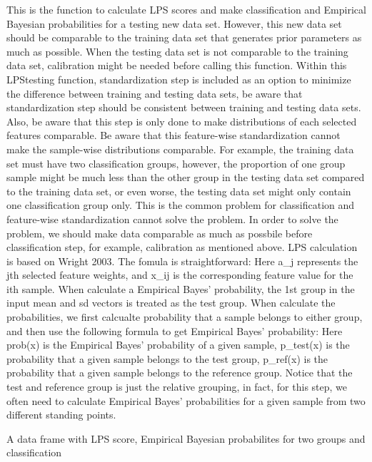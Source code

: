 \documentclass[letterpaper]{book}
\begin{document}
%
\begin{Details}\relax
This is the function to calculate LPS scores and make classification and 
Empirical Bayesian probabilities for a testing new data set. However, this new data set should be 
comparable to the training data set that generates prior parameters as much as possible. When the testing data set is not comparable
to the training data set, calibration might be needed before calling this function. 
Within this LPStesting function, standardization step is included as an option to minimize the difference 
between training and testing data sets, be aware that standardization step should be consistent between training and testing data sets. 
Also, be aware that this step is only done to make distributions of each selected
features comparable. Be aware that this feature-wise standardization cannot make the sample-wise distributions
comparable. For example, the training data set must have two classification groups, however, 
the proportion of one group sample might be much less than the other group in the testing data set 
compared to the training data set, or even worse, the testing data set might only contain one classification 
group only. This is the common problem for classification and feature-wise standardization cannot solve the problem. 
In order to solve the problem, we should make data comparable as much as possbile before classification step, for example, calibration as mentioned above. 
LPS calculation is based on Wright 2003. The fomula is straightforward:
Here a\_j represents the jth selected feature weights, and x\_ij is the corresponding feature value for the ith sample.
When calculate a Empirical Bayes' probability, the 1st group in the input mean and sd vectors is treated as the 
test group. When calculate the probabilities, we first calcualte probability that a sample belongs to either group,
and then use the following formula to get Empirical Bayes' probability:
Here prob(x) is the Empirical Bayes' probability of a given sample, p\_test(x) is the probability that a given sample
belongs to the test group, p\_ref(x) is the probability that a given sample belongs to the reference group.
Notice that the test and reference group is just the relative grouping, in fact, for this step, we often need
to calculate Empirical Bayes' probabilities for a given sample from two different standing points.
\end{Details}
%
\begin{Value}
A data frame with LPS score, Empirical Bayesian probabilites for two groups and classification
\end{Value}
\end{document}
